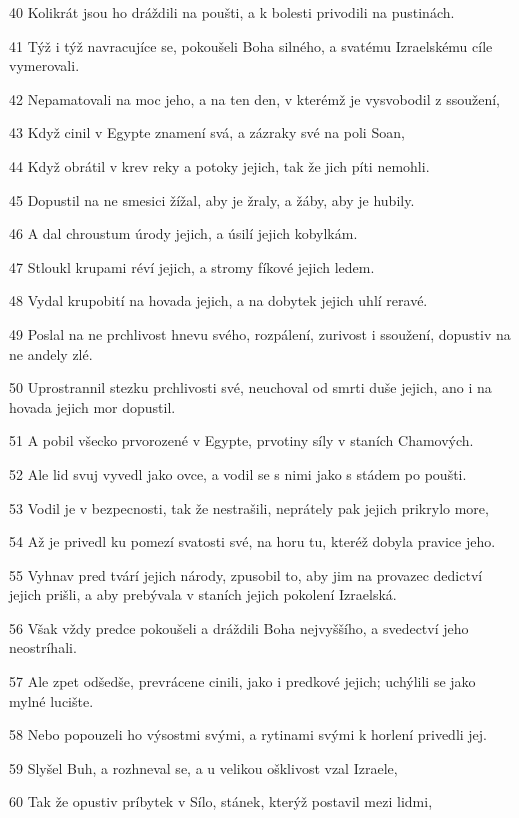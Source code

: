 \par 40 Kolikrát jsou ho dráždili na poušti, a k bolesti privodili na pustinách.
\par 41 Týž i týž navracujíce se, pokoušeli Boha silného, a svatému Izraelskému cíle vymerovali.
\par 42 Nepamatovali na moc jeho, a na ten den, v kterémž je vysvobodil z ssoužení,
\par 43 Když cinil v Egypte znamení svá, a zázraky své na poli Soan,
\par 44 Když obrátil v krev reky a potoky jejich, tak že jich píti nemohli.
\par 45 Dopustil na ne smesici žížal, aby je žraly, a žáby, aby je hubily.
\par 46 A dal chroustum úrody jejich, a úsilí jejich kobylkám.
\par 47 Stloukl krupami réví jejich, a stromy fíkové jejich ledem.
\par 48 Vydal krupobití na hovada jejich, a na dobytek jejich uhlí reravé.
\par 49 Poslal na ne prchlivost hnevu svého, rozpálení, zurivost i ssoužení, dopustiv na ne andely zlé.
\par 50 Uprostrannil stezku prchlivosti své, neuchoval od smrti duše jejich, ano i na hovada jejich mor dopustil.
\par 51 A pobil všecko prvorozené v Egypte, prvotiny síly v staních Chamových.
\par 52 Ale lid svuj vyvedl jako ovce, a vodil se s nimi jako s stádem po poušti.
\par 53 Vodil je v bezpecnosti, tak že nestrašili, neprátely pak jejich prikrylo more,
\par 54 Až je privedl ku pomezí svatosti své, na horu tu, kteréž dobyla pravice jeho.
\par 55 Vyhnav pred tvárí jejich národy, zpusobil to, aby jim na provazec dedictví jejich prišli, a aby prebývala v staních jejich pokolení Izraelská.
\par 56 Však vždy predce pokoušeli a dráždili Boha nejvyššího, a svedectví jeho neostríhali.
\par 57 Ale zpet odšedše, prevrácene cinili, jako i predkové jejich; uchýlili se jako mylné lucište.
\par 58 Nebo popouzeli ho výsostmi svými, a rytinami svými k horlení privedli jej.
\par 59 Slyšel Buh, a rozhneval se, a u velikou ošklivost vzal Izraele,
\par 60 Tak že opustiv príbytek v Sílo, stánek, kterýž postavil mezi lidmi,

